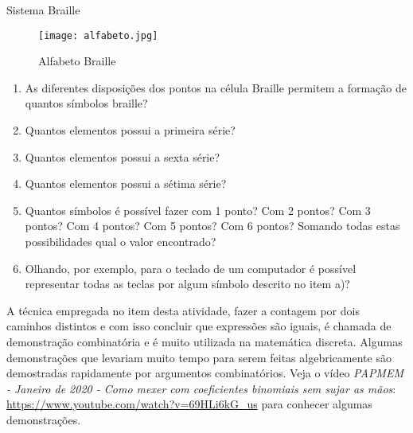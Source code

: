\begin{task}{Sistema Braille}
\begin{itemize}
\end{itemize}

\begin{figure}[H]
\centering

\texttt{[image: alfabeto.jpg]}
\caption{Alfabeto Braille}
\end{figure}

 
 
 \begin{enumerate}
     \item As diferentes disposições dos pontos na célula Braille permitem a formação de quantos símbolos braille?
     \item Quantos elementos possui a primeira série?
     \item Quantos elementos possui a sexta série?
     \item Quantos elementos possui a sétima série?
     \item Quantos símbolos é possível fazer com 1 ponto? Com 2 pontos? Com 3 pontos? Com 4 pontos? Com 5 pontos? Com 6 pontos? Somando todas estas possibilidades qual o valor encontrado?
      \item Olhando, por exemplo, para o teclado de um computador é possível representar todas as teclas por algum símbolo descrito no item a)? 
     
 \end{enumerate}

\end{task}

\begin{knowledge}
A técnica empregada no item  desta atividade, fazer a contagem por dois caminhos distintos e com isso concluir que expressões são iguais, é chamada de demonstração combinatória e é muito utilizada na matemática discreta. Algumas demonstrações que levariam muito tempo para serem feitas algebricamente são demostradas rapidamente por argumentos combinatórios. Veja o vídeo \textit{ PAPMEM - Janeiro de 2020 - Como mexer com coeficientes binomiais sem sujar as mãos}: \url{https://www.youtube.com/watch?v=69HLi6kG_us} para conhecer algumas demonstrações.
\end{knowledge}

